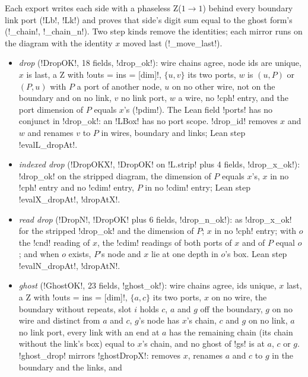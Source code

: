 {{{Each export writes each side with a phaseless Z($1\to1$) behind every boundary link port
(\lexlean!Lb!, \lexlean!Lk!) and proves that side's digit sum equal to the ghost form's (\lexpy!_chain!,
\lexpy!_chain_n!). Two step kinds remove the identities; each mirror runs on the diagram with the
identity $x$ moved last (\lexpy!_move_last!).
\begin{itemize}
\item \emph{drop} (\lexlean!DropOK!, 18 fields, \lexpy!drop_ok!): wire chains agree, node ids are
unique, $x$ is last, a Z with \lexlean!outs = ins = [dim]!, $\{u, v\}$ its two ports, $w$ is $(u, P)$
or $(P, u)$ with $P$ a port of another node, $u$ on no other wire, not on the boundary and on no
link, $v$ no link port, $w$ a wire, no \lexlean!cph! entry, and the port dimension of $P$ equals
$x$'s (\lexlean!pdim!). The Lean field \lexlean!ports! has no conjunct in \lexpy!drop_ok!: an
\lexpy!LBox! has no port scope. \lexpy!drop_id! removes $x$ and $w$ and
renames $v$ to $P$ in wires, boundary and links; Lean step \lexlean!evalL_dropAt!.
\item \emph{indexed drop} (\lexlean!DropOKX!, \lexlean!DropOK! on \lexlean!L.strip! plus 4 fields,
\lexpy!drop_x_ok!): \lexpy!drop_ok! on the stripped diagram, the dimension of $P$ equals $x$'s, $x$ in
no \lexcode!cph! entry and no \lexcode!cdim! entry, $P$ in no \lexcode!cdim! entry; Lean step
\lexlean!evalX_dropAt!, \lexlean!dropAtX!.
\item \emph{read drop} (\lexlean!DropN!, \lexlean!DropOK! plus 6 fields, \lexpy!drop_n_ok!): as
\lexpy!drop_x_ok! for the stripped \lexpy!drop_ok! and the dimension of $P$; $x$ in no \lexcode!cph!
entry; with $o$ the \lexcode!cnd! reading of $x$, the \lexcode!cdim! readings of both ports of $x$ and
of $P$ equal $o$; and when $o$ exists, $P$'s node and $x$ lie at one depth in $o$'s box. Lean step
\lexlean!evalN_dropAt!, \lexlean!dropAtN!.
\item \emph{ghost} (\lexlean!GhostOK!, 23 fields, \lexpy!ghost_ok!): wire chains agree, ids unique, $x$
last, a Z with \lexlean!outs = ins = [dim]!, $\{a, c\}$ its two ports, $x$ on no wire, the boundary
without repeats, slot $i$ holds $c$, $a$ and $g$ off the boundary, $g$ on no wire and distinct
from $a$ and $c$, $g$'s node has $x$'s chain, $c$ and $g$ on no link, $a$ no link port, every link
with an end at $a$ has the remaining chain (its chain without the link's box) equal to $x$'s
chain, and no ghost of \lexcode!gs! is at $a$, $c$ or $g$. \lexpy!ghost_drop! mirrors
\lexlean!ghostDropX!: removes $x$, renames $a$ and $c$ to $g$ in the boundary and the links, and

\end{itemize}}}}
